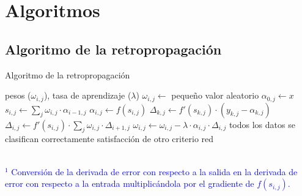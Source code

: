 \chapter{Algoritmos} \label{Appendix:Algorithms}

\section{Algoritmo de la retropropagación}

\begin{algorithm}
\caption{Algoritmo de la retropropagación}
\label{alg:Backpropagation}
\begin{algorithmic}[1]
        \State \VARIABLES pesos ($\omega_{i,j}$), tasa de aprendizaje ($\lambda$)
         
            \State $\omega_{i,j} \gets$ pequeño valor aleatorio
        \EndFor
        \Repeat
             
                    \State $\alpha_{0,j} \gets x$ 
                \EndFor
                        \State $s_{i,j} \gets \sum\limits_{j} \omega_{i,j}\cdot \alpha_{i-1,j}$
                        \State $\alpha_{i,j} \gets f(s_{i,j})$ 
                    \EndFor
                \EndFor
                 
                    \State $\Delta_{k,j} \gets f'(s_{k,j})\cdot (y_{k,j} - \alpha_{k,j})$ \textcolor{blue}{\footnotemark[1]}
                \EndFor
                        \State $\Delta_{i,j} \gets f'(s_{i,j})\cdot \sum\limits_{j} \omega_{i,j}\cdot \Delta_{i+1,j}$ \textcolor{blue}{\footnotemark[1]}
                    \EndFor
                \EndFor
                 
                    \State $\omega_{i,j} \gets \omega_{i,j} - \lambda \cdot \alpha_{i,j} \cdot \Delta_{i,j}$ 
                \EndFor
            \EndFor
        \Until todos los datos se clasifican correctamente \OR satisfacción de otro criterio
        \State \Return red
    \EndFunction
\end{algorithmic}
\textcolor{blue}{\footnotesize{\\ $^1$ Conversión de la derivada de error con respecto a la salida en la derivada de error con respecto a la entrada multiplicándola por el gradiente de $f(s_{i,j})$.}}
\end{algorithm}

